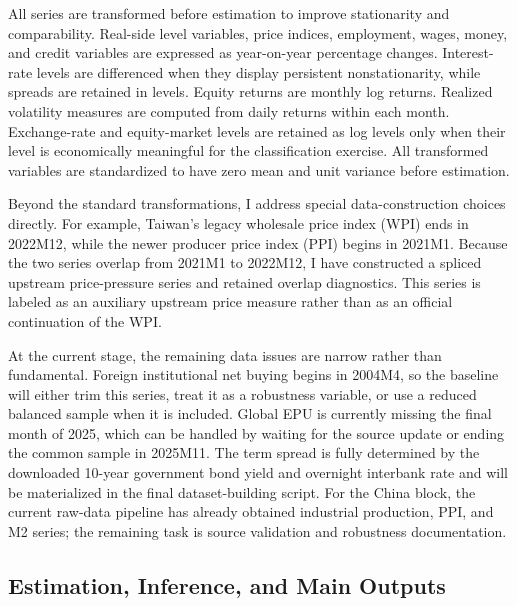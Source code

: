 \documentclass[12pt]{article}
\begin{document}
All series are transformed before estimation to improve stationarity and comparability. Real-side
level variables, price indices, employment, wages, money, and credit variables are expressed as
year-on-year percentage changes. Interest-rate levels are differenced when they display persistent
nonstationarity, while spreads are retained in levels. Equity returns are monthly log returns.
Realized volatility measures are computed from daily returns within each month. Exchange-rate
and equity-market levels are retained as log levels only when their level is economically meaningful
for the classification exercise. All transformed variables are standardized to have zero mean and
unit variance before estimation.

Beyond the standard transformations, I address special data-construction choices directly. For
example, Taiwan's
legacy wholesale price index (WPI) ends in 2022M12, while the newer producer price index
(PPI) begins in 2021M1. Because the two series overlap from 2021M1 to 2022M12, I have
constructed a spliced upstream price-pressure series and retained overlap diagnostics. This series
is labeled as an auxiliary upstream price measure rather than as an official continuation of the WPI.

At the current stage, the remaining data issues are narrow rather than fundamental. Foreign
institutional net buying begins in 2004M4, so the baseline will either trim this series, treat it as
a robustness variable, or use a reduced balanced sample when it is included. Global EPU is
currently missing the final month of 2025, which can be handled by waiting for the source update
or ending the common sample in 2025M11. The term spread is fully determined by the downloaded
10-year government bond yield and overnight interbank rate and will be materialized in the final
dataset-building script. For the China block, the current raw-data pipeline has already obtained
industrial production, PPI, and M2 series; the remaining task is source validation and robustness
documentation.

\subsection{Estimation, Inference, and Main Outputs}
\end{document}
